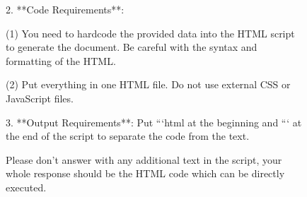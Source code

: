\begin{figure}[!ht]
\begin{center}
\begin{tcolorbox} [top=3pt,bottom=3pt, left=3pt, right=3pt, width=\linewidth, boxrule=1pt]
{{2. **Code Requirements**: 

    (1) You need to hardcode the provided data into the HTML script to generate the document. Be careful with the syntax and formatting of the HTML.
    
    (2) Put everything in one HTML file. Do not use external CSS or JavaScript files.

3. **Output Requirements**:
    Put ```html at the beginning and ``` at the end of the script to separate the code from the text.

Please don't answer with any additional text in the script, your whole response should be the HTML code which can be directly executed.}    \par}
    \end{tcolorbox}

    \end{center}
\end{figure}

